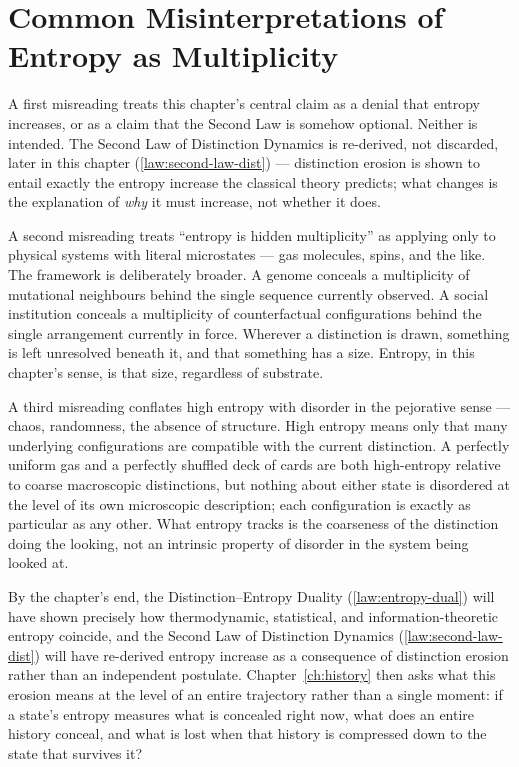 \documentclass[12pt,twoside,openright]{book}
\begin{document}
\section{Common Misinterpretations of Entropy as
  Multiplicity}
\label{sec:ch3-misinterpretations}

A first misreading treats this chapter's central claim as a
denial that entropy increases, or as a claim that the Second
Law is somehow optional. Neither is intended. The Second Law
of Distinction Dynamics is re-derived, not discarded, later
in this chapter (\cref{law:second-law-dist}) --- distinction
erosion is shown to entail exactly the entropy increase the
classical theory predicts; what changes is the explanation of
\emph{why} it must increase, not whether it does.

A second misreading treats ``entropy is hidden multiplicity''
as applying only to physical systems with literal microstates
--- gas molecules, spins, and the like. The framework is
deliberately broader. A genome conceals a multiplicity of
mutational neighbours behind the single sequence currently
observed. A social institution conceals a multiplicity of
counterfactual configurations behind the single arrangement
currently in force. Wherever a distinction is drawn, something
is left unresolved beneath it, and that something has a size.
Entropy, in this chapter's sense, is that size, regardless of
substrate.

A third misreading conflates high entropy with disorder in
the pejorative sense --- chaos, randomness, the absence of
structure. High entropy means only that many underlying
configurations are compatible with the current distinction. A
perfectly uniform gas and a perfectly shuffled deck of cards
are both high-entropy relative to coarse macroscopic
distinctions, but nothing about either state is disordered at
the level of its own microscopic description; each
configuration is exactly as particular as any other. What
entropy tracks is the coarseness of the distinction doing the
looking, not an intrinsic property of disorder in the system
being looked at.

By the chapter's end, the Distinction--Entropy Duality
(\cref{law:entropy-dual}) will have shown precisely how
thermodynamic, statistical, and information-theoretic entropy
coincide, and the Second Law of Distinction Dynamics
(\cref{law:second-law-dist}) will have re-derived entropy
increase as a consequence of distinction erosion rather than
an independent postulate. Chapter~\ref{ch:history} then asks
what this erosion means at the level of an entire trajectory
rather than a single moment: if a state's entropy measures
what is concealed right now, what does an entire history
conceal, and what is lost when that history is compressed
down to the state that survives it?
\end{document}
